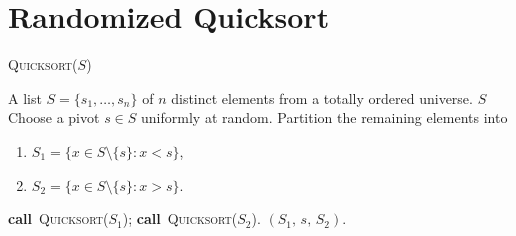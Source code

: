 \documentclass[12pt,a4paper]{article}
\newcommand{\CALL}[1]{\textbf{call}~#1}   %
\begin{document}
	\section{Randomized Quicksort}
	\begin{algorithm}[H]
		\caption{\textsc{Randomized Quicksort}}
		\label{alg:qsort}
		\textsc{Quicksort}(\(S\))
		\begin{algorithmic}[1]
			\REQUIRE A list \(S=\{s_1,\dots,s_n\}\) of \(n\) distinct elements from a totally ordered universe.
			\RETURN \(S\)
			\ENDIF
			\STATE Choose a pivot \(s\in S\) uniformly at random.
			\STATE Partition the remaining elements into
			\begin{enumerate}[label=(\alph*),nosep]
				\item \(S_1=\{x\in S\setminus\{s\}:x<s\}\),
				\item \(S_2=\{x\in S\setminus\{s\}:x>s\}\).
			\end{enumerate}
			\STATE \CALL{\textsc{Quicksort}(\(S_1\))}; \CALL{\textsc{Quicksort}(\(S_2\))}.
			\RETURN \((S_1,\,s,\,S_2)\).
		\end{algorithmic}
	\end{algorithm}
\end{document}
